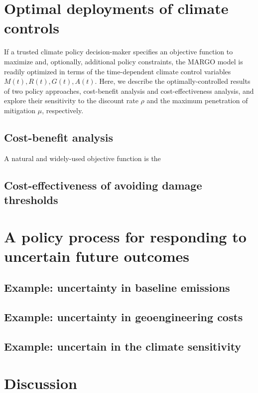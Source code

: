 \documentclass[9pt,twocolumn,twoside,lineno]{pnas-new}
\begin{document}
\section*{Optimal deployments of climate controls}

If a trusted climate policy decision-maker specifies an objective function to maximize and, optionally, additional policy constraints, the MARGO model is readily optimized in terms of the time-dependent climate control variables $M(t), R(t), G(t), A(t)$. Here, we describe the optimally-controlled results of two policy approaches, cost-benefit analysis and cost-effectiveness analysis, and explore their sensitivity to the discount rate $\rho$ and the maximum penetration of mitigation $\mu$, respectively.

\subsection*{Cost-benefit analysis}

A natural and widely-used objective function is the 

\subsection*{Cost-effectiveness of avoiding damage thresholds}

\section*{A policy process for responding to uncertain future outcomes}

\subsection*{Example: uncertainty in baseline emissions}

\subsection*{Example: uncertainty in geoengineering costs}

\subsection*{Example: uncertain in the climate sensitivity}

\section*{Discussion}
\end{document}
